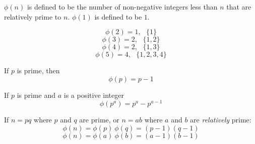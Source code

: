 \documentclass[11pt, oneside]{article}
\begin{document}
$\phi(n)$ is defined to be the number of non-negative integers less than $n$ that are relatively prime to $n$.  $\phi(1)$ is defined to be $1$.

\[ \phi(2) = 1, \ \ \ \{ 1 \} \]
\[ \phi(3) = 2, \ \ \ \{ 1,2 \} \]
\[ \phi(4) = 2, \ \ \ \{ 1,3 \} \]
\[ \phi(5) = 4, \ \ \ \{ 1,2,3,4 \} \]

If $p$ is prime, then 
\[ \phi(p) = p - 1 \]

If $p$ is prime and $a$ is a positive integer
\[ \phi(p^a) = p^a - p^{a-1} \]

If $n = pq$ where $p$ and $q$ are prime, or $n = ab$ where $a$ and $b$ are \emph{relatively} prime:
\[ \phi(n) = \phi(p) \ \phi(q) = (p-1)(q-1) \]
\[ \phi(n) = \phi(a) \ \phi(b) = (a-1)(b-1) \]
\end{document}

